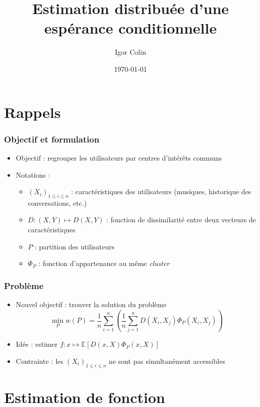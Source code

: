 \documentclass[c]{beamer}
\title{Estimation distribu\'ee d'une esp\'erance conditionnelle}
\author{Igor Colin}
\date{\today}
\begin{document}
\begin{frame}
  \maketitle
\end{frame}

\section{Rappels}

\begin{frame}
  \frametitle{Objectif et formulation}

  \begin{itemize}
    \item Objectif : regrouper les utilisateurs par centres d'int\'erêts communs
    \item Notations :
      \begin{itemize}
        \item $(X_i)_{1 \leq i \leq n}$ : caract\'eristiques des utilisateurs (musiques,
          historique des conversations, etc.)
        \item $D : (X, Y) \mapsto D(X, Y)$ : fonction de dissimilarit\'e entre deux
          vecteurs de caract\'eristiques
        \item $P$ : partition des utilisateurs
        \item $\Phi_P$ : fonction d'appartenance au même \emph{cluster}
      \end{itemize}
  \end{itemize}
\end{frame}

\begin{frame}
  \frametitle{Probl\`eme}

  \begin{itemize}
    \item Nouvel objectif : trouver la solution du probl\`eme
      \[
      \min_P w(P) = \frac{1}{n} \sum_{i =1}^n \left( \frac{1}{n} \sum_{j=1}^{n} D(X_i, X_j) \Phi_P(X_i, X_j) \right)
      \]
    \item Id\'ee : estimer $f : x \mapsto \mathbb{E}[D(x, X) \Phi_P(x, X)]$
    \item Contrainte : les $(X_i)_{1 \leq i \leq n}$ ne sont pas simultan\'ement accessibles
  \end{itemize}
\end{frame}

\section{Estimation de fonction}
\end{document}
